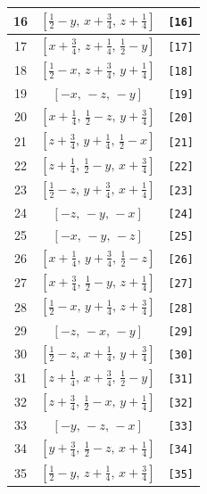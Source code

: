 \documentclass[fleqn,8pt]{jsarticle}
\begin{document}
\begin{longtable}{ccc}
16 & $\left[ \frac{1}{2} - y,\, x + \frac{3}{4},\, z + \frac{1}{4} \right]$ & {\tt [16]} \\ \hline
17 & $\left[ x + \frac{3}{4},\, z + \frac{1}{4},\, \frac{1}{2} - y \right]$ & {\tt [17]} \\ \hline
18 & $\left[ \frac{1}{2} - x,\, z + \frac{3}{4},\, y + \frac{1}{4} \right]$ & {\tt [18]} \\ \hline
19 & $\left[ - x,\, - z,\, - y \right]$ & {\tt [19]} \\ \hline
20 & $\left[ x + \frac{1}{4},\, \frac{1}{2} - z,\, y + \frac{3}{4} \right]$ & {\tt [20]} \\ \hline
21 & $\left[ z + \frac{3}{4},\, y + \frac{1}{4},\, \frac{1}{2} - x \right]$ & {\tt [21]} \\ \hline
22 & $\left[ z + \frac{1}{4},\, \frac{1}{2} - y,\, x + \frac{3}{4} \right]$ & {\tt [22]} \\ \hline
23 & $\left[ \frac{1}{2} - z,\, y + \frac{3}{4},\, x + \frac{1}{4} \right]$ & {\tt [23]} \\ \hline
24 & $\left[ - z,\, - y,\, - x \right]$ & {\tt [24]} \\ \hline
25 & $\left[ - x,\, - y,\, - z \right]$ & {\tt [25]} \\ \hline
26 & $\left[ x + \frac{1}{4},\, y + \frac{3}{4},\, \frac{1}{2} - z \right]$ & {\tt [26]} \\ \hline
27 & $\left[ x + \frac{3}{4},\, \frac{1}{2} - y,\, z + \frac{1}{4} \right]$ & {\tt [27]} \\ \hline
28 & $\left[ \frac{1}{2} - x,\, y + \frac{1}{4},\, z + \frac{3}{4} \right]$ & {\tt [28]} \\ \hline
29 & $\left[ - z,\, - x,\, - y \right]$ & {\tt [29]} \\ \hline
30 & $\left[ \frac{1}{2} - z,\, x + \frac{1}{4},\, y + \frac{3}{4} \right]$ & {\tt [30]} \\ \hline
31 & $\left[ z + \frac{1}{4},\, x + \frac{3}{4},\, \frac{1}{2} - y \right]$ & {\tt [31]} \\ \hline
32 & $\left[ z + \frac{3}{4},\, \frac{1}{2} - x,\, y + \frac{1}{4} \right]$ & {\tt [32]} \\ \hline
33 & $\left[ - y,\, - z,\, - x \right]$ & {\tt [33]} \\ \hline
34 & $\left[ y + \frac{3}{4},\, \frac{1}{2} - z,\, x + \frac{1}{4} \right]$ & {\tt [34]} \\ \hline
35 & $\left[ \frac{1}{2} - y,\, z + \frac{1}{4},\, x + \frac{3}{4} \right]$ & {\tt [35]} \\ \hline

\end{longtable}
\end{document}
